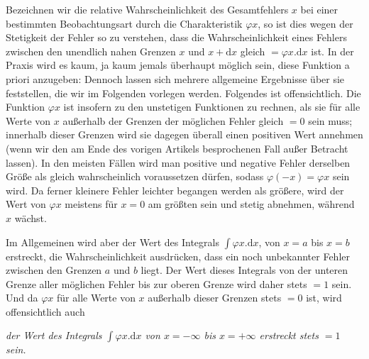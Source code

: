 Bezeichnen wir die relative Wahrscheinlichkeit des Gesamtfehlers \(x\) bei einer bestimmten Beobachtungsart durch die Charakteristik \(\varphi x\), so ist dies wegen der Stetigkeit der Fehler so zu verstehen, dass die Wahrscheinlichkeit eines Fehlers zwischen den unendlich nahen Grenzen \(x\) und \(x+\mathrm{d}x\) gleich \(=\varphi x.\mathrm{d}x\) ist. In der Praxis wird es kaum, ja kaum jemals überhaupt möglich sein, diese Funktion a priori anzugeben: Dennoch lassen sich mehrere allgemeine Ergebnisse über sie feststellen, die wir im Folgenden vorlegen werden. Folgendes ist offensichtlich. Die Funktion \(\varphi x\) ist insofern zu den unstetigen Funktionen zu rechnen, als sie für alle Werte von \(x\) außerhalb der Grenzen der möglichen Fehler gleich \(=0\) sein muss; innerhalb dieser Grenzen wird sie dagegen überall einen positiven Wert annehmen (wenn wir den am Ende des vorigen Artikels besprochenen Fall außer Betracht lassen). In den meisten Fällen wird man positive und negative Fehler derselben Größe als gleich wahrscheinlich voraussetzen dürfen, sodass \(\varphi(-x)=\varphi x\) sein wird. Da ferner kleinere Fehler leichter begangen werden als größere, wird der Wert von \(\varphi x\) meistens für \(x=0\) am größten sein und stetig abnehmen, während \(x\) wächst.

Im Allgemeinen wird aber der Wert des Integrals \(\int\varphi x.\mathrm{d}x\), von \(x=a\) bis \(x=b\) erstreckt, die Wahrscheinlichkeit ausdrücken, dass ein noch unbekannter Fehler zwischen den Grenzen \(a\) und \(b\) liegt. Der Wert dieses Integrals von der unteren Grenze aller möglichen Fehler bis zur oberen Grenze wird daher stets \(=1\) sein. Und da \(\varphi x\)
für alle Werte von \(x\) außerhalb dieser Grenzen stets \(=0\) ist, wird offensichtlich auch

\textit{der Wert des Integrals \(\int\varphi x.\mathrm{d}x\) von \(x=-\infty\) bis \(x=+\infty\) erstreckt stets \(=1\) sein.}

